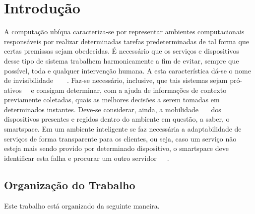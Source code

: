 \chapter{Introdução}

A computação ubíqua caracteriza-se por representar ambientes computacionais responsáveis por realizar determinadas tarefas predeterminadas de tal forma que certas premissas sejam obedecidas. É necessário que os serviços e dispositivos desse tipo de sistema trabalhem harmonicamente a fim de evitar, sempre que possível, toda e qualquer intervenção humana. A esta característica dá-se o nome de invisibilidade~\cite{gomes2007}~\cite{buzeto2010}~\cite{weiser1993}~\cite{weiser1999}. Faz-se necessário, inclusive, que tais sistemas sejam pró-ativos~\cite{gomes2007}~\cite{buzeto2010} e consigam determinar, com a ajuda de informações de contexto previamente coletadas, quais as melhores decisões a serem tomadas em determinados instantes. Deve-se considerar, ainda, a mobilidade~\cite{gomes2007}~\cite{buzeto2010}~\cite{weiser1999} dos dispositivos presentes e regidos dentro do ambiente em questão, a saber, o smartspace. Em um ambiente inteligente se faz necessária a adaptabilidade de serviços de forma transparente para os clientes, ou seja, caso um serviço não esteja mais sendo provido por determinado dispositivo, o smartspace deve identificar esta falha e procurar um outro servidor~\cite{gomes2007}~\cite{passarinho2008}~\cite{paranhos2009}.

\section{Organização do Trabalho}
Este trabalho está organizado da seguinte maneira.


